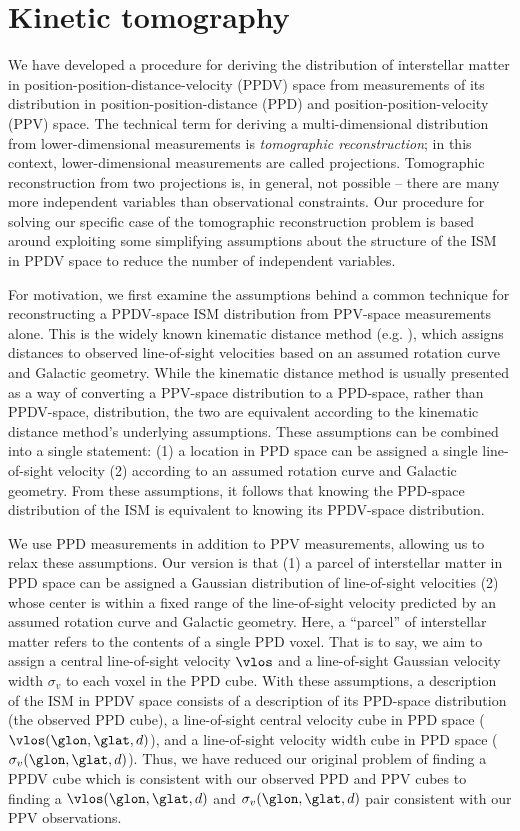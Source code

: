 \section{Kinetic tomography}
\label{sec:KT}
We have developed a procedure for deriving the distribution of interstellar matter in position-position-distance-velocity (PPDV) space from measurements of its distribution in position-position-distance (PPD) and position-position-velocity (PPV) space. 
The technical term for deriving a multi-dimensional distribution from lower-dimensional measurements is \emph{tomographic reconstruction}; in this context, lower-dimensional measurements are called projections. 
Tomographic reconstruction from two projections is, in general, not possible -- there are many more independent variables than observational constraints. 
Our procedure for solving our specific case of the tomographic reconstruction problem is based around exploiting some simplifying assumptions about the structure of the ISM in PPDV space to reduce the number of independent variables.

For motivation, we first examine the assumptions behind a common technique for reconstructing a PPDV-space ISM distribution from PPV-space measurements alone. 
This is the widely known kinematic distance method (e.g. \citealt{Levine_2006}), which assigns distances to observed line-of-sight velocities based on an assumed rotation curve and Galactic geometry. 
While the kinematic distance method is usually presented as a way of converting a PPV-space distribution to a PPD-space, rather than PPDV-space, distribution, the two are equivalent according to the kinematic distance method's underlying assumptions.
These assumptions can be combined into a single statement: (1) a location in PPD space can be assigned a single line-of-sight velocity (2) according to an assumed rotation curve and Galactic geometry. 
From these assumptions, it follows that knowing the PPD-space distribution of the ISM is equivalent to knowing its PPDV-space distribution. 

We use PPD measurements in addition to PPV measurements, allowing us to relax these assumptions. 
Our version is that (1) a parcel of interstellar matter in PPD space can be assigned a Gaussian distribution of line-of-sight velocities (2) whose center is within a fixed range of the line-of-sight velocity predicted by an assumed rotation curve and Galactic geometry. 
Here, a ``parcel'' of interstellar matter refers to the contents of a single PPD voxel. 
That is to say, we aim to assign a central line-of-sight velocity $\vlos$ and a line-of-sight Gaussian velocity width $\sigma_v$ to each voxel in the PPD cube. 
With these assumptions, a description of the ISM in PPDV space consists of a description of its PPD-space distribution (the observed PPD cube), a line-of-sight central velocity cube in PPD space ($\vlos(\glon, \glat, d)$), and a line-of-sight velocity width cube in PPD space ($\sigma_v (\glon, \glat, d)$). 
Thus, we have reduced our original problem of finding a PPDV cube which is consistent with our observed PPD and PPV cubes to finding a $\vlos(\glon, \glat, d)$ and $\sigma_v(\glon, \glat, d)$ pair consistent with our PPV observations.


